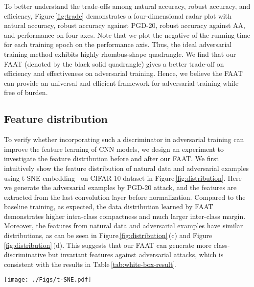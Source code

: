 \documentclass[10pt,twocolumn,letterpaper]{article}
\begin{document}
To better understand the trade-offs among natural accuracy, robust accuracy, and efficiency,
Figure\,\ref{fig:trade} demonstrates a four-dimensional radar plot with natural accuracy, robust accuracy against PGD-20, robust accuracy against AA, and performance on four axes. Note that we plot the negative of the running time for each training epoch on the performance axis. Thus, the ideal adversarial training method exhibits highly rhombus-shape quadrangle. We find that our FAAT (denoted by the black solid quadrangle) gives a better trade-off on efficiency and effectiveness on adversarial training. Hence, we believe the FAAT can provide an universal and efficient framework for adversarial training while free of burden.


\subsection{Feature distribution}
To verify whether incorporating such a discriminator in adversarial training can improve the feature learning of CNN models, we design an experiment to investigate the feature distribution before and after our FAAT. We first intuitively show the feature distribution of natural data and adversarial examples using t-SNE embedding~\cite{kang2019contrastive} on CIFAR-10 dataset in Figure\,\ref{fig:distribution}. Here we generate the adversarial examples by PGD-20 attack, and the features are extracted from the last convolution layer before normalization. Compared to the baseline training, as expected, the data distribution learned by FAAT demonstrates higher intra-class compactness and much larger inter-class margin. Moreover, the features from natural data and adversarial examples have similar distributions, as can be seen in Figure\,\ref{fig:distribution}\,(c) and Figure\,\ref{fig:distribution}\,(d). This suggests that our FAAT can generate more class-discriminative but invariant features against adversarial attacks, which is consistent with the results in Table\,\ref{tab:white-box-result}. %

\begin{figure*}[!t]
\centering
\texttt{[image: ./Figs/t-SNE.pdf]}
    \caption{Visualization of feature distribution in WideResNet-34-10 model trained wo/w our proposed FAAT on CIFAR-10 dataset. (a)-(b) Feature distribution of natural data and adversarial examples in model trained with baseline method. (c)-(d) Feature distribution of natural data and adversarial examples in model trained with FAAT method.}
\label{fig:distribution}
\end{figure*}
\end{document}
